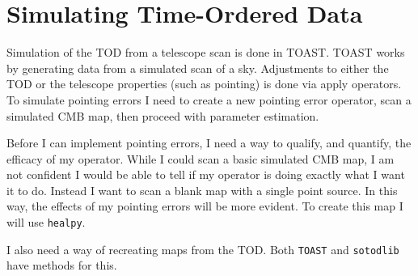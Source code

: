 \section{Simulating Time-Ordered Data}

Simulation of the TOD from a telescope scan is done in TOAST. TOAST works by generating data from a simulated scan of a sky. Adjustments to either the TOD or the telescope properties (such as pointing) is done via apply operators. To simulate pointing errors I need to create a new pointing error operator, scan a simulated CMB map, then proceed with parameter estimation.

Before I can implement pointing errors, I need a way to qualify, and quantify, the efficacy of my operator. While I could scan a basic simulated CMB map, I am not confident I would be able to tell if my operator is doing exactly what I want it to do. Instead I want to scan a blank map with a single point source. In this way, the effects of my pointing errors will be more evident. To create this map I will use \verb+healpy+.

I also need a way of recreating maps from the TOD. Both \verb+TOAST+ and \verb+sotodlib+ have methods for this.

